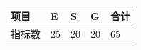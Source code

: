 \begin{tabular}{lllll}
\toprule
项目 & E & S & G & 合计 \\
\midrule
指标数 & 25 & 20 & 20 & 65 \\
\bottomrule
\end{tabular}
